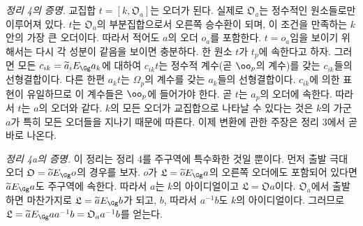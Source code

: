 
\medskip
\noindent\emph{정리 4의 증명.} 교집합 $t=[k,\mathfrak O_a]$는 오더가 된다. 실제로 $\mathfrak O_a$는 정수적인 원소들로만 이루어져 있다. $t$는 $\mathfrak O_a$의 부분집합으로서 오른쪽 승수환이 되며, 이 조건을 만족하는 $k$ 안의 가장 큰 오더이다. 따라서 적어도 $a$의 오더 $o_a$를 포함한다. $t=o_a$임을 보이기 위해서는 다시 각 성분이 같음을 보이면 충분하다. 한 원소 $t$가 $t_p$에 속한다고 하자. 그러면 모든 $c_{ik}=\widetilde a_iE_\Gg a_k$에 대하여 $c_{ik}t$는 정수적 계수(곧 $\oo_p$의 계수)를 갖는 $c_{ik}$들의 선형결합이다. 다른 한편 $a_kt$는 $\Omega_p$의 계수를 갖는 $a_k$들의 선형결합이다. $c_{ik}$에 의한 표현이 유일하므로 이 계수들은 $\oo_p$에 들어가야 한다. 곧 $t$는 $a_p$의 오더에 속한다. 따라서 $t$는 $a$의 오더와 같다. $k$의 모든 오더가 교집합으로 나타날 수 있다는 것은 $k$의 가군 $a$가 특히 모든 오더들을 지나기 때문에 따른다. 이제 변환에 관한 주장은 정리 3에서 곧바로 나온다.

\medskip
\noindent\emph{정리 4a의 증명.} 이 정리는 정리 4를 주구역에 특수화한 것일 뿐이다. 먼저 출발 극대 오더 $\mathfrak O=\widetilde oE_\Gg o$의 경우를 보자. $o$가 $\mathfrak L=\widetilde oE_\Gg a$의 오른쪽 오더에도 포함되어 있다면 $\widetilde aE_\Gg a$도 주구역에 속한다. 따라서 $a$는 $k$의 아이디얼이고 $\mathfrak L=\mathfrak Oa$이다. $\mathfrak O_a$에서 출발하면 마찬가지로 $\mathfrak L=\widetilde aE_\Gg b$가 되고, $b$, 따라서 $a^{-1}b$도 $k$의 아이디얼이다. 그러므로 $\mathfrak L=\widetilde aE_\Gg aa^{-1}b=\mathfrak O_a a^{-1}b$를 얻는다.
